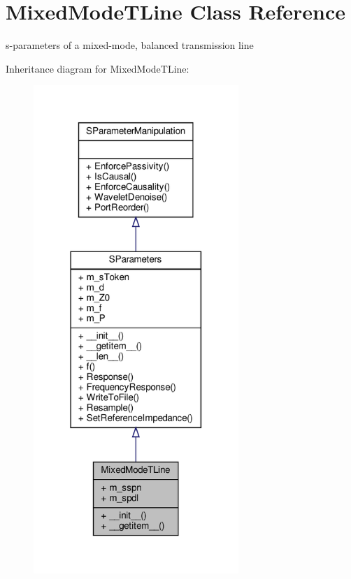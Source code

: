\hypertarget{classSignalIntegrity_1_1SParameters_1_1Devices_1_1MixedModeTline_1_1MixedModeTLine}{}\section{Mixed\+Mode\+T\+Line Class Reference}
\label{classSignalIntegrity_1_1SParameters_1_1Devices_1_1MixedModeTline_1_1MixedModeTLine}


s-\/parameters of a mixed-\/mode, balanced transmission line  




Inheritance diagram for Mixed\+Mode\+T\+Line\+:
\nopagebreak
\begin{figure}[H]
\begin{center}
\leavevmode
\includegraphics[width=220pt]{classSignalIntegrity_1_1SParameters_1_1Devices_1_1MixedModeTline_1_1MixedModeTLine__inherit__graph}
\end{center}
\end{figure}


